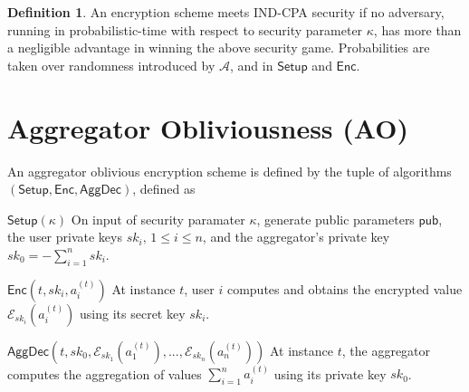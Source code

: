 \documentclass[10pt,letterpaper,oneside,twocolumn,journal]{IEEEtran}
\theoremstyle{definition}
\newtheorem{definition}{Definition}[section]
\theoremstyle{definition}
\theoremstyle{remark}
\newcommand\shrtdots{\!...}
\begin{document}
\begin{definition}
    An encryption scheme meets IND-CPA security if no adversary, running in probabilistic-time with respect to security parameter $\kappa$, has more than a negligible advantage in winning the above security game. Probabilities are taken over randomness introduced by $\mathcal{A}$, and in $\mathsf{Setup}$ and $\mathsf{Enc}$.
\end{definition}

\section{Aggregator Obliviousness (AO)} \label{app:ao}
An aggregator oblivious encryption scheme is defined by the tuple of algorithms $(\mathsf{Setup}, \mathsf{Enc}, \mathsf{AggDec})$, defined as
\begin{LaTeXdescription}
    \item[$\mathsf{Setup}(\kappa)$] On input of security paramater $\kappa$, generate public parameters $\mathsf{pub}$, the user private keys $sk_i,\,1\leq i \leq n$, and the aggregator's private key $sk_0=-\sum^n_{i=1}sk_i$.
    \item[$\mathsf{Enc}(t, sk_i, a^{(t)}_i)$] At instance $t$, user $i$ computes and obtains the encrypted value $\mathcal{E}_{sk_i}(a^{(t)}_i)$ using its secret key $sk_i$.
    \item[$\mathsf{AggDec}(t, sk_0, \mathcal{E}_{sk_1}(a^{(t)}_1),\shrtdots,\mathcal{E}_{sk_n}(a^{(t)}_n))$] At instance $t$, the aggregator computes the aggregation of values $\sum^{n}_{i=1} a^{(t)}_i$ using its private key $sk_0$.
\end{LaTeXdescription}
\end{document}
